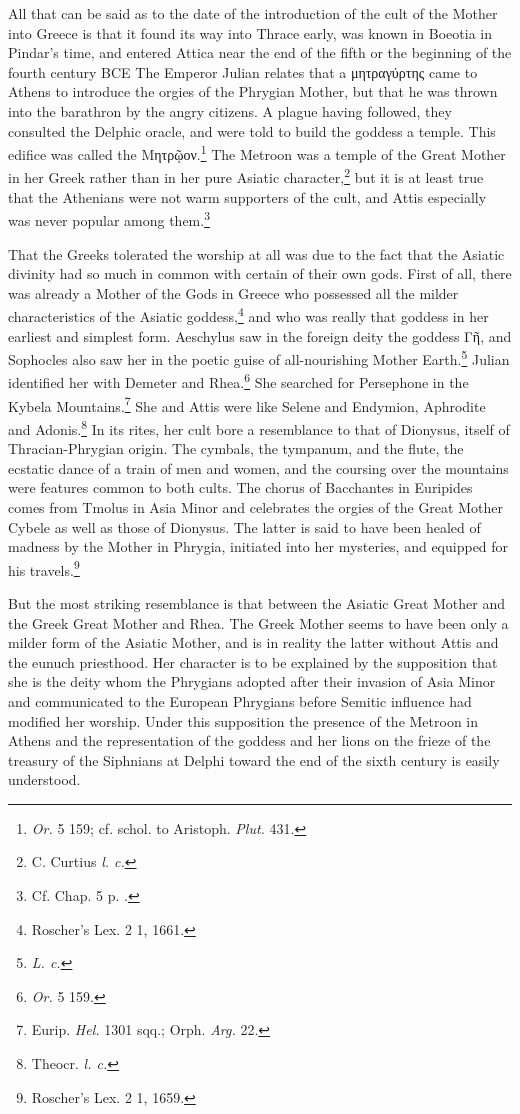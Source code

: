 \documentclass[a4paper, 11pt, oneside, polutonikogreek, french]{article}
\begin{document}
All that can be said as to the date of the introduction of the cult of the Mother into Greece is that it found its way into Thrace early, was known in Boeotia in Pindar's time, and entered Attica near the end of the fifth or the beginning of the fourth century \textsc{BCE} The Emperor Julian relates that a μητραγύρτης came to Athens to introduce the orgies of the Phrygian Mother, but that he was thrown into the barathron by the angry citizens. A plague having followed, they consulted the Delphic oracle, and were told to build the goddess a temple. This edifice was called the Μητρῷον.\footnote{\emph{Or.} 5 159; cf. schol. to Aristoph. \emph{Plut.} 431.} The Metroon was a temple of the Great Mother in her Greek rather than in her pure Asiatic character,\footnote{C. Curtius \emph{l. c.}} but it is at least true that the Athenians were not warm supporters of the cult, and Attis especially was never popular among them.\footnote{Cf. Chap. 5 p. .}

That the Greeks tolerated the worship at all was due to the fact that the Asiatic divinity had so much in common with certain of their own gods. First of all, there was already a Mother of the Gods in Greece who possessed all the milder characteristics of the Asiatic goddess,\footnote{Roscher's Lex. 2 1, 1661.} and who was really that goddess in her earliest and simplest form. Aeschylus saw in the foreign deity the goddess Γῆ, and Sophocles also saw her in the poetic guise of all-nourishing Mother Earth.\footnote{\emph{L. c.}} Julian identified her with Demeter and Rhea.\footnote{\emph{Or.} 5 159.} She searched for Persephone in the Kybela Mountains.\footnote{Eurip. \emph{Hel.} 1301 sqq.; Orph. \emph{Arg.} 22.} She and Attis were like Selene and Endymion, Aphrodite and Adonis.\footnote{Theocr. \emph{l. c.}} In its rites, her cult bore a resemblance to that of Dionysus, itself of Thracian-Phrygian origin. The cymbals, the tympanum, and the flute, the ecstatic dance of a train of men and women, and the coursing over the mountains were features common to both cults. The chorus of Bacchantes in Euripides comes from Tmolus in Asia Minor and celebrates the orgies of the Great Mother Cybele as well as those of Dionysus. The latter is said to have been healed of madness by the Mother in Phrygia, initiated into her mysteries, and equipped for his travels.\footnote{Roscher's Lex. 2 1, 1659.}

But the most striking resemblance is that between the Asiatic Great Mother and the Greek Great Mother and Rhea. The Greek Mother seems to have been only a milder form of the Asiatic Mother, and is in reality the latter without Attis and the eunuch priesthood. Her character is to be explained by the supposition that she is the deity whom the Phrygians adopted after their invasion of Asia Minor and communicated to the European Phrygians before Semitic influence had modified her worship. Under this supposition the presence of the Metroon in Athens and the representation of the goddess and her lions on the frieze of the treasury of the Siphnians at Delphi toward the end of the sixth century is easily understood.
\end{document}
